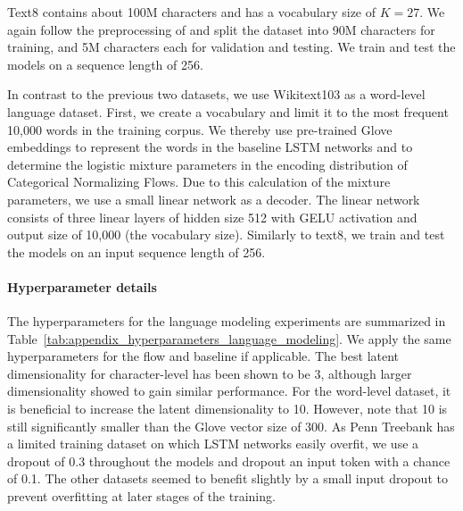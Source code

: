 Text8 contains about 100M characters and has a vocabulary size of $K=27$. We again follow the preprocessing of \citet{mikolov2012subword} and split the dataset into 90M characters for training, and 5M characters each for validation and testing. We train and test the models on a sequence length of 256.

In contrast to the previous two datasets, we use Wikitext103 as a word-level language dataset. First, we create a vocabulary and limit it to the most frequent 10,000 words in the training corpus. We thereby use pre-trained Glove \cite{Glove} embeddings to represent the words in the baseline LSTM networks and to determine the logistic mixture parameters in the encoding distribution of Categorical Normalizing Flows. Due to this calculation of the mixture parameters, we use a small linear network as a decoder. The linear network consists of three linear layers of hidden size 512 with GELU \cite{GELU} activation and output size of 10,000 (the vocabulary size). Similarly to text8, we train and test the models on an input sequence length of 256.

\paragraph{Hyperparameter details} The hyperparameters for the language modeling experiments are summarized in Table~\ref{tab:appendix_hyperparameters_language_modeling}. We apply the same hyperparameters for the flow and baseline if applicable. The best latent dimensionality for character-level has been shown to be 3, although larger dimensionality showed to gain similar performance. For the word-level dataset, it is beneficial to increase the latent dimensionality to 10. However, note that 10 is still significantly smaller than the Glove vector size of 300. As Penn Treebank has a limited training dataset on which LSTM networks easily overfit, we use a dropout \cite{Dropout} of 0.3 throughout the models and dropout an input token with a chance of 0.1. The other datasets seemed to benefit slightly by a small input dropout to prevent overfitting at later stages of the training.

